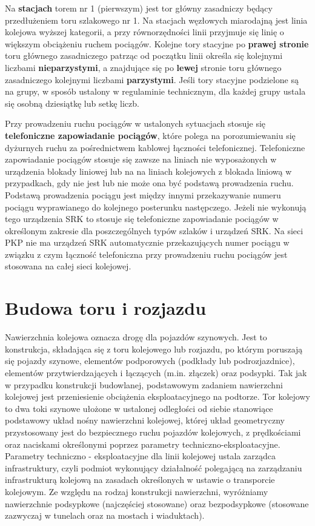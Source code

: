 Na \textbf{stacjach} torem nr 1 (pierwszym) jest tor główny zasadniczy będący przedłużeniem toru szlakowego nr 1. Na stacjach węzłowych miarodajną jest linia kolejowa wyższej kategorii, a przy równorzędności linii przyjmuje się linię o większym obciążeniu ruchem pociągów. Kolejne tory stacyjne po \textbf{prawej stronie} toru głównego zasadniczego patrząc od początku linii określa się kolejnymi liczbami \textbf{nieparzystymi}, a znajdujące się po \textbf{lewej} stronie toru głównego zasadniczego kolejnymi liczbami \textbf{parzystymi}. Jeśli tory stacyjne podzielone są na grupy, w sposób ustalony w regulaminie technicznym, dla każdej grupy ustala się osobną dziesiątkę lub setkę liczb.

Przy prowadzeniu ruchu pociągów w ustalonych sytuacjach stosuje się \textbf{telefoniczne zapowiadanie pociągów}, które polega na porozumiewaniu się dyżurnych ruchu za pośrednictwem kablowej łączności telefonicznej. Telefoniczne zapowiadanie pociągów stosuje się zawsze na liniach nie wyposażonych w urządzenia blokady liniowej lub na na liniach kolejowych z blokada liniową w przypadkach, gdy nie jest lub nie może ona być podstawą prowadzenia ruchu. Podstawą prowadzenia pociągu jest między innymi przekazywanie numeru pociągu wyprawianego do kolejnego posterunku następczego. Jeżeli nie wykonują tego urządzenia SRK to stosuje się telefoniczne zapowiadanie pociągów w określonym zakresie dla poszczególnych typów szlaków i urządzeń SRK. 
Na sieci PKP nie ma urządzeń SRK automatycznie przekazujących numer pociągu w związku z czym łączność telefoniczna przy prowadzeniu ruchu pociągów jest stosowana na całej sieci kolejowej.

\section{Budowa toru i rozjazdu}

Nawierzchnia kolejowa oznacza drogę dla pojazdów szynowych. Jest to konstrukcja, składająca się z toru kolejowego lub rozjazdu, po którym poruszają się pojazdy szynowe, elementów podporowych (podkłady lub podrozjazdnice), elementów przytwierdzających i łączących (m.in. złączek) oraz podsypki. Tak jak w przypadku konstrukcji budowlanej, podstawowym zadaniem nawierzchni kolejowej jest przeniesienie obciążenia eksploatacyjnego na podtorze.
Tor kolejowy to dwa toki szynowe ułożone w ustalonej odległości od siebie stanowiące podstawowy układ nośny nawierzchni kolejowej, której układ geometryczny przystosowany jest do bezpiecznego ruchu pojazdów kolejowych, z prędkościami oraz naciskami określonymi poprzez parametry techniczno-eksploatacyjne. Parametry techniczno - eksploatacyjne dla linii kolejowej ustala zarządca infrastruktury, czyli podmiot wykonujący działalność polegającą na zarządzaniu infrastrukturą kolejową na zasadach określonych w ustawie o transporcie kolejowym.
Ze względu na rodzaj konstrukcji nawierzchni, wyróżniamy nawierzchnie podsypkowe (najczęściej stosowane) oraz bezpodsypkowe (stosowane zazwyczaj w tunelach oraz na mostach i wiaduktach). 

